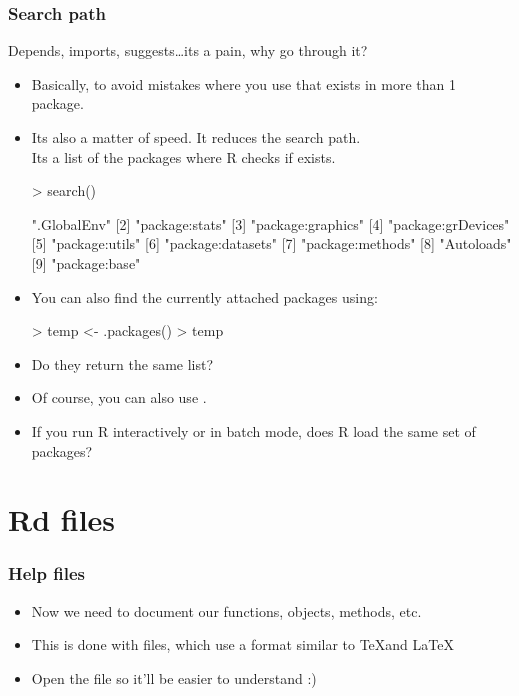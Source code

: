 \begin{frame}
  \frametitle{Search path}
  Depends, imports, suggests\ldots its a pain, why go through it?
  \begin{itemize}
  \item Basically, to avoid mistakes where you use  that exists in more than 1 package.
  \item Its also a matter of speed. It reduces the \alert{search} path. \\ Its a list of the packages where R checks if  exists. \scriptsize
\begin{Schunk}
\begin{Sinput}
> search()
\end{Sinput}
\begin{Soutput}
[1] ".GlobalEnv"       
[2] "package:stats"    
[3] "package:graphics" 
[4] "package:grDevices"
[5] "package:utils"    
[6] "package:datasets" 
[7] "package:methods"  
[8] "Autoloads"        
[9] "package:base"     
\end{Soutput}
\end{Schunk}
  \item \normalsize You can also find the currently attached packages using:
\begin{Schunk}
\begin{Sinput}
> temp <- .packages()
> temp
\end{Sinput}
\end{Schunk}
  \item Do they return the same list? 
  \item Of course, you can also use .
  \item If you run R interactively or in batch mode, does R load the same set of packages?
  \end{itemize}
\end{frame}

\section{Rd files}

\begin{frame}[allowframebreaks]
  \frametitle{Help files}
  \begin{itemize}
  \item Now we need to document our functions, objects, methods, etc.
  \item This is done with  files, which use a format similar to \TeX and \LaTeX
  \item Open the  file so it'll be easier to understand :)
  \end{itemize}
\end{frame}

